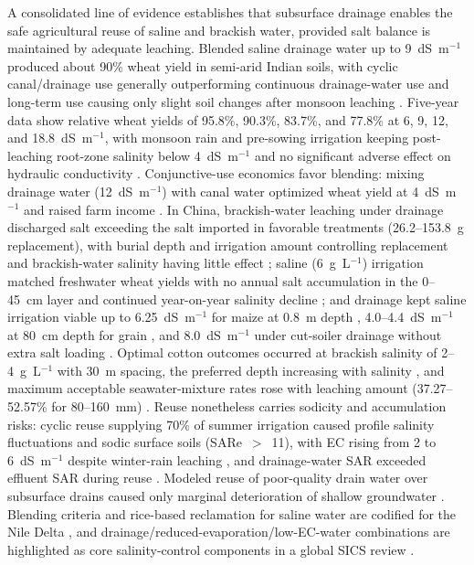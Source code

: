 \documentclass[11pt]{article}
\begin{document}
A consolidated line of evidence establishes that subsurface drainage enables the safe agricultural reuse of saline and brackish water, provided salt balance is maintained by adequate leaching. Blended saline drainage water up to 9~dS~m$^{-1}$ produced about 90\% wheat yield in semi-arid Indian soils, with cyclic canal/drainage use generally outperforming continuous drainage-water use and long-term use causing only slight soil changes after monsoon leaching \parencite{Sharma2004}. Five-year data show relative wheat yields of 95.8\%, 90.3\%, 83.7\%, and 77.8\% at 6, 9, 12, and 18.8~dS~m$^{-1}$, with monsoon rain and pre-sowing irrigation keeping post-leaching root-zone salinity below 4~dS~m$^{-1}$ and no significant adverse effect on hydraulic conductivity \parencite{Sharma1998}. Conjunctive-use economics favor blending: mixing drainage water (12~dS~m$^{-1}$) with canal water optimized wheat yield at 4~dS~m$^{-1}$ and raised farm income \parencite{AGNIHOTRI1992}. In China, brackish-water leaching under drainage discharged salt exceeding the salt imported in favorable treatments (26.2--153.8~g replacement), with burial depth and irrigation amount controlling replacement and brackish-water salinity having little effect \parencite{Li2023}; saline (6~g~L$^{-1}$) irrigation matched freshwater wheat yields with no annual salt accumulation in the 0--45~cm layer and continued year-on-year salinity decline \parencite{Gao2023}; and drainage kept saline irrigation viable up to 6.25~dS~m$^{-1}$ for maize at 0.8~m depth \parencite{Feng2017}, 4.0--4.4~dS~m$^{-1}$ at 80~cm depth for grain \parencite{Feng2021}, and 8.0~dS~m$^{-1}$ under cut-soiler drainage without extra salt loading \parencite{Neha2022}. Optimal cotton outcomes occurred at brackish salinity of 2--4~g~L$^{-1}$ with 30~m spacing, the preferred depth increasing with salinity \parencite{Li2024}, and maximum acceptable seawater-mixture rates rose with leaching amount (37.27--52.57\% for 80--160~mm) \parencite{Lu2019}. Reuse nonetheless carries sodicity and accumulation risks: cyclic reuse supplying 70\% of summer irrigation caused profile salinity fluctuations and sodic surface soils (SARe~$>$~11), with EC rising from 2 to 6~dS~m$^{-1}$ despite winter-rain leaching \parencite{Mitchell2000}, and drainage-water SAR exceeded effluent SAR during reuse \parencite{Jayawardane2001}. Modeled reuse of poor-quality drain water over subsurface drains caused only marginal deterioration of shallow groundwater \parencite{KARAJEH1994c}. Blending criteria and rice-based reclamation for saline water are codified for the Nile Delta \parencite{Kotb2000}, and drainage/reduced-evaporation/low-EC-water combinations are highlighted as core salinity-control components in a global SICS review \parencite{Cuevas2019}.
\end{document}
